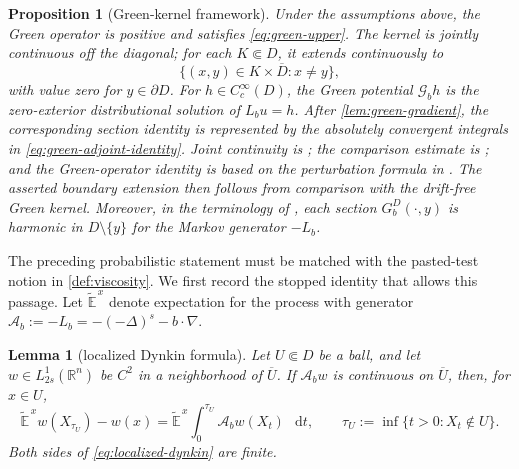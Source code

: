 \documentclass[reqno]{amsart}
\numberwithin{equation}{section}
\theoremstyle{plain}
\newtheorem{lemma}[theorem]{Lemma}
\newtheorem{proposition}[theorem]{Proposition}
\theoremstyle{definition}
\theoremstyle{remark}
\newcommand{\R}{\mathbb R}
\newcommand{\differential}{\mathop{}\!\mathrm d}
\newcommand{\Lb}{L_b}
\newcommand{\rev}[1]{#1}
\begin{document}
\begin{proposition}[Green-kernel framework]\label{prop:green-framework}
Under the assumptions above, the Green operator is positive and satisfies
\eqref{eq:green-upper}.  \rev{The kernel is jointly continuous off the
diagonal; for each $K\Subset D$, it extends continuously to
\[
 \{(x,y)\in K\times\overline D:x\ne y\},
\]
with value zero for $y\in\partial D$.}  For $h\in C_c^\infty(D)$, the
Green potential $\mathcal G_bh$ is the zero-exterior distributional solution of
$\Lb u=h$.  \rev{After \cref{lem:green-gradient}, the corresponding
section identity is represented by the absolutely convergent integrals in
\eqref{eq:green-adjoint-identity}.  Joint continuity is
\cite[Lemma~7]{BogdanJakubowski2012}; the comparison estimate is
\cite[Theorem~1]{BogdanJakubowski2012}; and the Green-operator identity is
based on the perturbation formula in
\cite[Section~3]{BogdanJakubowski2012}.  The asserted boundary extension
then follows from comparison with the drift-free Green kernel.  Moreover,
in the terminology of \cite[Definition~2]{BogdanJakubowski2012}, each
section $G_b^D(\cdot,y)$ is harmonic in $D\setminus\{y\}$ for the Markov
generator $-L_b$.}
\end{proposition}

\begingroup
The preceding probabilistic statement must be matched with the pasted-test
notion in \cref{def:viscosity}.  We first record the stopped identity that
allows this passage.  Let $\widetilde{\mathbb E}^{\,x}$ denote expectation
for the process with generator
$\mathcal A_b:=-L_b=-(-\Delta)^s-b\cdot\nabla$.

\begin{lemma}[localized Dynkin formula]\label{lem:localized-dynkin}
Let $U\Subset D$ be a ball, and let
$w\in L^1_{2s}(\R^n)$ be $C^2$ in a neighborhood of $\overline U$.
If $\mathcal A_bw$ is continuous on $\overline U$, then, for $x\in U$,
\begin{equation}\label{eq:localized-dynkin}
 \widetilde{\mathbb E}^{\,x}w(X_{\tau_U})-w(x)
 =\widetilde{\mathbb E}^{\,x}\int_0^{\tau_U}
   \mathcal A_bw(X_t)\,\differential t,
 \qquad
 \tau_U:=\inf\{t>0:X_t\notin U\}.
\end{equation}
Both sides of \eqref{eq:localized-dynkin} are finite.
\end{lemma}
\end{document}
